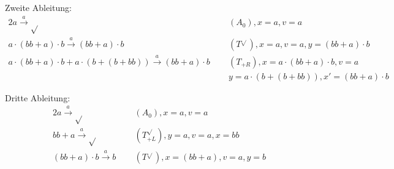 \documentclass[10pt,a4paper,oneside,ngerman,numbers=noenddot]{scrartcl}
\begin{document}
    Zweite Ableitung:
    \begin{alignat*}{2}
        a \overset{a}{\rightarrow} \sqrt{} \;&&\; (A_0), x = a, v = a \\
        a \cdot (bb + a) \cdot b \overset{a}{\rightarrow} (bb + a) \cdot b \;&&\; (T^{\sqrt{}}), x = a, v = a, y = (bb + a) \cdot b \\
        a \cdot (bb + a) \cdot b + a \cdot (b + (b + bb)) \overset{a}{\rightarrow} (bb + a) \cdot b \;&&\; (T_{+R}), x = a \cdot (bb + a) \cdot b, v = a \\
        &&\; y = a \cdot (b + (b + bb)), x' = (bb + a) \cdot b
    \end{alignat*}

    Dritte Ableitung:
    \begin{alignat*}{2}
        a \overset{a}{\rightarrow} \sqrt{} \;&&\; (A_0), x = a, v = a \\
        bb + a \overset{a}{\rightarrow} \sqrt{} \;&&\; (T^{\sqrt{}}_{+L}), y = a, v = a, x = bb \\
        (bb + a) \cdot b \overset{a}{\rightarrow} b \;&&\; (T^{\sqrt{}}), x = (bb + a), v = a, y = b
    \end{alignat*}
\section{} %
\end{document}
